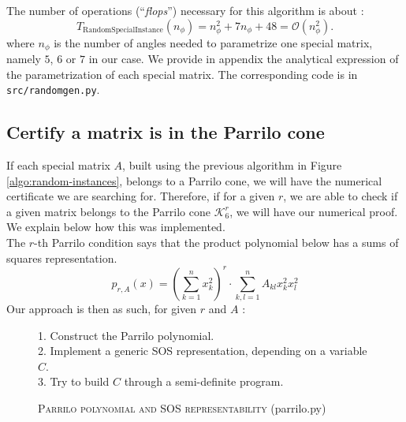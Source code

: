 \documentclass[onecolumn,11pt,a4paper]{article}
\theoremstyle{plain}  %
\theoremstyle{remark}  %
\begin{document}
The number of operations (``\emph{flops}'') necessary for this algorithm is about :
\begin{equation}
	\label{eq:complexity_randomgen}
	T_{\mathrm{RandomSpecialInstance}}(n_\phi) =  n_\phi^2 + 7 n_\phi + 48 = \mathcal{O}(n_\phi^2).
\end{equation}
where $n_\phi$ is the number of angles needed to parametrize one special matrix, namely $5$, $6$ or $7$ in our case.
We provide in appendix the analytical expression of the parametrization of each special matrix.
The corresponding code is in \texttt{src/randomgen.py}.
\subsection{Certify a matrix is in the Parrilo cone}
\label{sub:parrilo-certificate}
If each special matrix $A$, built using the previous algorithm in Figure \ref{algo:random-instances},
belongs to a Parrilo cone, we will have the numerical certificate we are searching for.
Therefore, if for a given $r$, we are able to check if a given matrix belongs to the Parrilo cone $\mathcal{K}_6^r$,
we will have our numerical proof. We explain below how this was implemented.\\
The $r$-th Parrilo condition says that the product polynomial below has a sums of squares representation.
\begin{equation}
	\label{eq:parrilo-polynomial}
	p_{r, A}(x) = \left(\sum_{k = 1}^n x_k^2\right)^r \cdot \sum_{k, l = 1}^n A_{kl} x_k^2 x_l^2
\end{equation}
Our approach is then as such, for given $r$ and $A$ :

\begin{figure}[h!]
	\begin{framed}
		1. Construct the Parrilo polynomial.\\
		2. Implement a generic SOS representation, depending on a variable $C$.\\
		3. Try to build $C$ through a semi-definite program.
	\end{framed}
	\caption{\textsc{Parrilo polynomial and SOS representability} (parrilo.py)}
	\label{algo:parrilo}
\end{figure}
\end{document}

